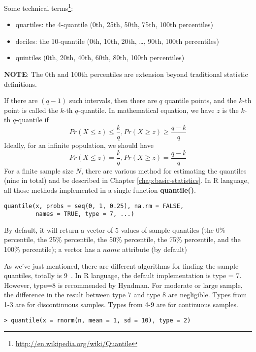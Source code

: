 Some technical
terms\footnote{\url{http://en.wikipedia.org/wiki/Quantile}}:
\begin{itemize}
\item quartiles: the 4-quantile (0th, 25th, 50th, 75th, 100th percentiles)
\item deciles: the 10-quantile (0th, 10th, 20th, …, 90th, 100th
  percentiles)
\item quintiles (0th, 20th, 40th, 60th, 80th, 100th percentiles)
\end{itemize}

{\bf NOTE}: The 0th and 100th percentiles are extension beyond
traditional statistic definitions.



If there are $(q-1)$ such intervals, then there are $q$ quantile
points, and the $k$-th point is called the $k$-th $q$-quantile. In
mathematical equation, we have $z$ is the $k$-th $q$-quantile if
\begin{equation}
  \label{eq:14}
  Pr(X \le z) \le \frac{k}{q}, Pr(X \ge z) \ge \frac{q-k}{q}
\end{equation}
Ideally, for an infinite population, we should have
\begin{equation}
  \label{eq:15}
   Pr(X \le z) = \frac{k}{q}, Pr(X \ge z) = \frac{q-k}{q}
\end{equation}
For a finite sample size $N$, there are various method for estimating
the quantiles (nine in total) and be described in Chapter
\ref{chap:basic-statistics}. In R language, all those methods
implemented in a single function {\bf quantile()}.


\begin{verbatim}
quantile(x, probs = seq(0, 1, 0.25), na.rm = FALSE,
         names = TRUE, type = 7, ...)
\end{verbatim}
By default, it will return a vector of 5 values of sample quantiles (the 0\%
percentile, the 25\% percentile, the 50\% percentile, the 75\%
percentile, and the 100\% percentile); a vector has a $name$ attribute
(by default) 

As we've just mentioned, there are different algorithms for finding
the sample quantiles, totally is 9~\cite{hyndman1996sqs}. In R
language, the default implementation is type = 7. However, type=8 is
recommended by Hyndman. For moderate or large sample, the difference
in the result between type 7 and type 8 are negligible.  Types from
1-3 are for discontinuous samples. Types from 4-9 are for continuous
samples.

\begin{lstlisting}
> quantile(x = rnorm(n, mean = 1, sd = 10), type = 2)
\end{lstlisting}



